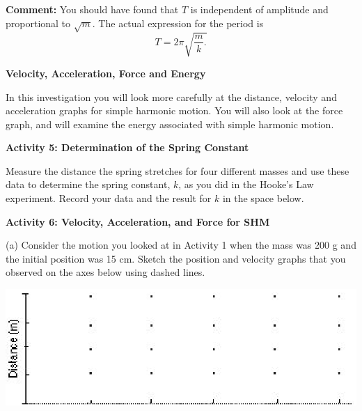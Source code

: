 \textbf{Comment:} You should have found that $T$ is independent of amplitude 
and proportional to \( \sqrt{m} \). The actual expression for the period is
\[T=2\pi \sqrt{\frac{m}{k}.}\]


\textbf{Velocity, Acceleration, Force and Energy }

In this investigation you will look more carefully at the distance, velocity
and acceleration graphs for simple harmonic motion. You will also look at the
force graph, and will examine the energy associated with simple harmonic motion.

\textbf{Activity 5: Determination of the Spring Constant }

Measure the distance the spring stretches for four different masses and use
these data to determine the spring constant, $k$, as you did in the Hooke's Law experiment. Record your data and the result for $k$ in the space below.
\vspace{40mm}

\textbf{Activity 6: Velocity, Acceleration, and Force for SHM} 

(a) Consider the motion you looked at in Activity 1 when the mass was 200 g
and the initial position was 15 cm. Sketch the position and velocity graphs
that you observed on the axes below using dashed lines.

\vspace{0.3cm}
{\par\centering \includegraphics{periodic_motion/periodic_motion_fig2.eps} \par}
\vspace{0.3cm}

